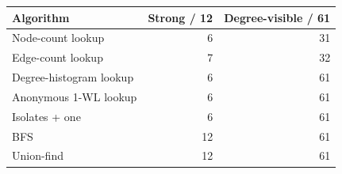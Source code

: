 \begin{tabular}{@{}lrr@{}}
\toprule
Algorithm & Strong / 12 & Degree-visible / 61\\
\midrule
Node-count lookup & 6 & 31\\
Edge-count lookup & 7 & 32\\
Degree-histogram lookup & 6 & 61\\
Anonymous 1-WL lookup & 6 & 61\\
Isolates + one & 6 & 61\\
BFS & 12 & 61\\
Union-find & 12 & 61\\
\bottomrule
\end{tabular}
